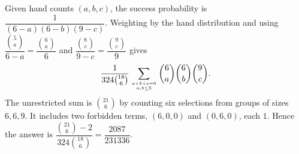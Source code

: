 Given hand counts $(a,b,c)$, the success probability is $\dfrac{1}{(6-a)(6-b)(9-c)}$. Weighting by the hand distribution and using $\dfrac{\binom5a}{6-a}=\dfrac{\binom6a}{6}$ and $\dfrac{\binom8c}{9-c}=\dfrac{\binom9c}{9}$ gives \[\dfrac{1}{324\binom{18}{6}}\sum_{a+b+c=6\atop a,b\le5}\binom6a\binom6b\binom9c.\]The unrestricted sum is $\binom{21}{6}$ by counting six selections from groups of sizes $ 6,6,9 $. It includes two forbidden terms, $(6,0,0)$ and $(0,6,0)$, each $ 1 $. Hence the answer is $\dfrac{\binom{21}{6}-2}{324\binom{18}{6}}=\boxed{\dfrac{2087}{231336}}$.
